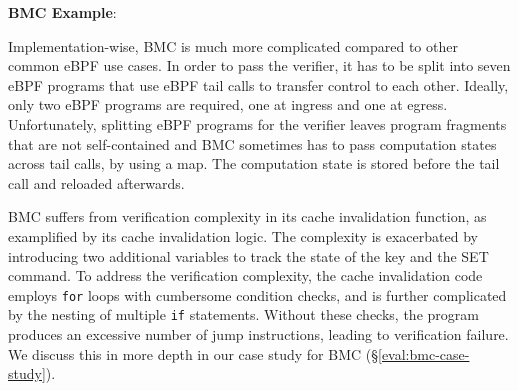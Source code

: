 \noindent\textbf{BMC Example}:

Implementation-wise, BMC is much more complicated
    compared to other common eBPF use cases.
In order to pass the verifier, it has to be split into seven
    eBPF programs that use eBPF tail calls to transfer control to each other. 
Ideally, only two eBPF programs are required, one at ingress and one at egress.
Unfortunately, splitting eBPF programs for the verifier leaves program fragments 
    that are not self-contained and
    BMC sometimes has to pass computation states across tail calls, by using a map.
The computation state is stored before the tail call and reloaded afterwards.

BMC suffers from verification complexity in its cache invalidation function,
    as examplified by its cache invalidation logic. %
The complexity is exacerbated by introducing two additional variables to track
    the state of the key and the SET command.
To address the verification complexity,
    the cache invalidation code employs \texttt{for} loops with cumbersome
    condition checks, and is further complicated by the nesting of multiple
    \texttt{if} statements.
Without these checks, the program produces an excessive number of jump instructions,
    leading to verification failure.
We discuss this in more depth in our case study for BMC
    (\S\ref{eval:bmc-case-study}).

